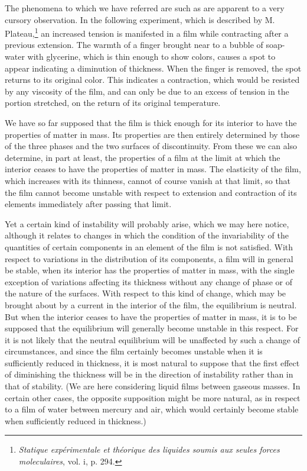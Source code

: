 \documentclass[12pt]{memoir}
\begin{document}
The phenomena to which we have referred are such as are apparent to a very cursory observation. In the following experiment, which is described by M. Plateau,\footnote{\textit{Statique exp\'{e}rimentale et th\'{e}orique des liquides soumis aux seules forces moleculaires}, vol. i, p. 294.} an increased tension is manifested in a film while contracting after a previous extension. The warmth of a finger brought near to a bubble of soap-water with glycerine, which is thin enough to show colors, causes a spot to appear indicating a diminution of thickness. When the finger is removed, the spot returns to its original color.  This indicates a contraction, which would be resisted by any viscosity of the film, and can only be due to an excess of tension in the portion stretched, on the return of its original temperature.

We have so far supposed that the film is thick enough for its interior to have the properties of matter in mass. Its properties are then entirely determined by those of the three phases and the two surfaces of discontinuity. From these we can also determine, in part at least, the properties of a film at the limit at which the interior ceases to have the properties of matter in mass. The elasticity of the film, which increases with its thinness, cannot of course vanish at that limit, so that the film cannot become unstable with respect to extension and contraction of its elements immediately after passing that limit.

Yet a certain kind of instability will probably arise, which we may here notice, although it relates to changes in which the condition of the invariability of the quantities of certain components in an element of the film is not satisfied. With respect to variations in the distribution of its components, a film will in general be stable, when its interior has the properties of matter in mass, with the single exception of variations affecting its thickness without any change of phase or of the nature of the surfaces. With respect to this kind of change, which may be brought about by a current in the interior of the film, the equilibrium is neutral. But when the interior ceases to have the properties of matter in mass, it is to be supposed that the equilibrium will generally become unstable in this respect. For it is not likely that the neutral equilibrium will be unaffected by such a change of circumstances, and since the film certainly becomes unstable when it is sufficiently reduced in thickness, it is most natural to suppose that the first effect of diminishing the thickness will be in the direction of instability rather than in that of stability. (We are here considering liquid films between gaseous masses. In certain other cases, the opposite supposition might be more natural, as in respect to a film of water between mercury and air, which would certainly become stable when sufficiently reduced in thickness.)
\end{document}
